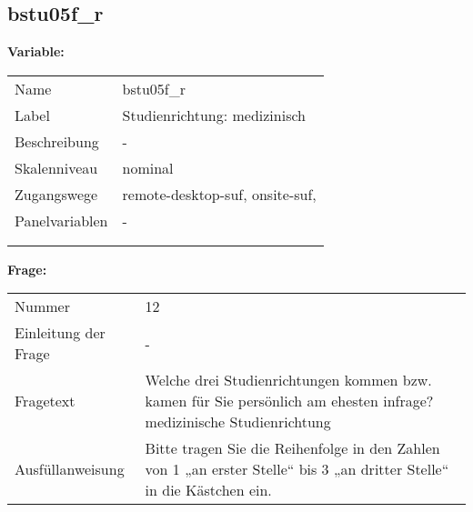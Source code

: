 	
	
	\subsection{bstu05f\_r}
	\label{subSection:bstu05f_r}

	\noindent\textbf{Variable:}\\
		\begin{tabular}{lL{11.3cm}}
			\label{tableVariable:bstu05f_r}
			Name & bstu05f\_r \\
			Label & Studienrichtung: medizinisch \\
			Beschreibung & - \\
			Skalenniveau & nominal \\
			Zugangswege &
				remote-desktop-suf,
				onsite-suf,
 \\
			Panelvariablen & -
			 \\
			 \\
 \\
		\end{tabular}

		\vspace*{1 cm}
		\noindent\textbf{Frage:}\\
		\begin{tabular}{lL{11.3cm}}
			\label{tableQuestion:bstu05f_r}
			Nummer & 12 \\
			Einleitung der Frage & - \\
			Fragetext & Welche drei Studienrichtungen kommen bzw. kamen für Sie persönlich am ehesten infrage?
medizinische Studienrichtung \\
			Ausfüllanweisung & Bitte tragen Sie die Reihenfolge in den Zahlen von 1 „an erster Stelle“ bis 3 „an dritter Stelle“ in die Kästchen ein. \\
		\end{tabular}





